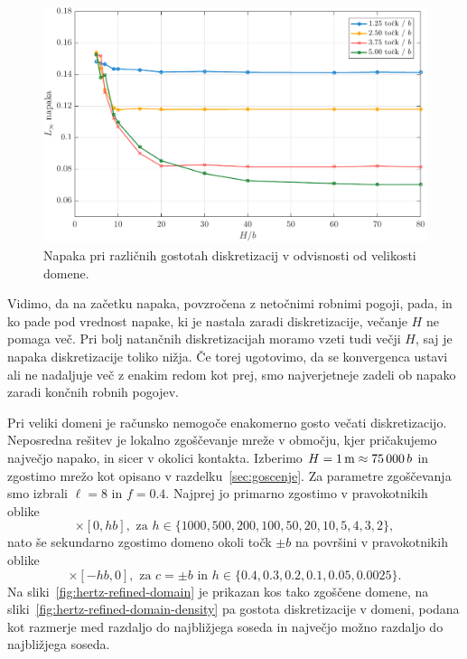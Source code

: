 \documentclass[12pt,a4paper,twoside]{article}
\theoremstyle{definition} %
\theoremstyle{plain} %
\numberwithin{equation}{section}
\newlength{\iw}
\begin{document}
\begin{figure}[!h]
  \centering
  \includegraphics[width=\iw]{images/hertzian_domain_too_small2.pdf}
  \caption[Napaka v odvisnosti od velikosti domene.]{Napaka pri različnih
  gostotah diskretizacij v odvisnosti od velikosti domene.}
  \label{fig:hertz-domain-too-small}
\end{figure}

Vidimo, da na začetku napaka, povzročena z netočnimi robnimi pogoji, pada, in ko pade pod vrednost
napake, ki je nastala zaradi diskretizacije, večanje $H$ ne pomaga več. Pri bolj natančnih
diskretizacijah moramo vzeti tudi večji $H$, saj je napaka diskretizacije toliko nižja. Če torej
ugotovimo, da se konvergenca ustavi ali ne nadaljuje več z enakim redom kot prej, smo najverjetneje
zadeli ob napako zaradi končnih robnih pogojev.

Pri veliki domeni je računsko nemogoče enakomerno gosto večati diskretizacijo. Neposredna rešitev je
lokalno zgoščevanje mreže v območju, kjer pričakujemo največjo napako, in sicer v okolici kontakta.
Izberimo $H = \unit[1]{m} \approx 75\,000\, b$ in zgostimo mrežo kot opisano v
razdelku~\ref{sec:goscenje}. Za parametre zgoščevanja smo izbrali $\ell = 8$ in $f = 0.4$.
Najprej jo primarno zgostimo v pravokotnikih oblike
\begin{equation}
   [-hb, hb] \times [0, hb], \text{ za } h \in \{1000, 500, 200, 100, 50, 20, 10, 5, 4, 3, 2\},
\end{equation}
nato še sekundarno zgostimo domeno okoli točk $\pm b$ na površini v pravokotnikih oblike
\begin{equation}
  [c-hb, c+hb] \times [-hb, 0], \text{ za } c = \pm b \text{ in } h \in \{0.4, 0.3, 0.2, 0.1, 0.05, 0.0025\}.
\end{equation}
Na sliki~\ref{fig:hertz-refined-domain} je prikazan kos tako zgoščene domene, na
sliki~\ref{fig:hertz-refined-domain-density} pa gostota diskretizacije v domeni, podana kot razmerje
med razdaljo do najbližjega soseda in največjo možno razdaljo do najbližjega soseda.
\end{document}
